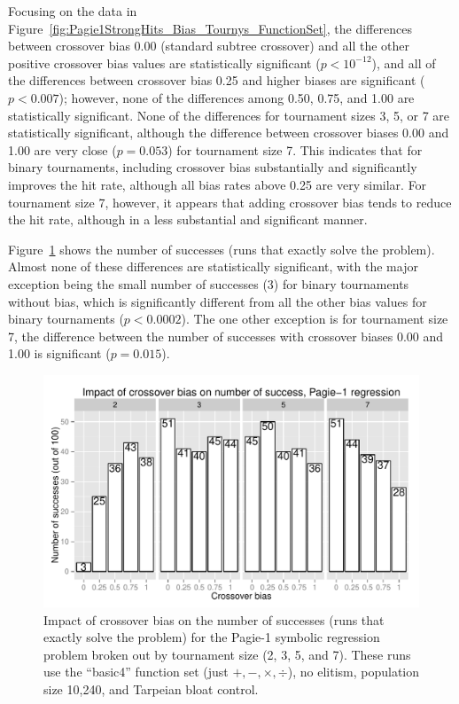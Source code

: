 \documentclass{sig-alternate}
\begin{document}
Focusing on the data in Figure~\ref{fig:Pagie1StrongHits_Bias_Tournys_FunctionSet}, the differences between crossover
bias 0.00 (standard subtree crossover) and all the other positive crossover bias values are statistically significant
($p<10^{-12}$), and all of the differences between crossover bias 0.25 and higher biases are significant ($p<0.007$);
however, none of the differences among 0.50, 0.75, and 1.00 are statistically significant. None of the differences for
tournament sizes 3, 5, or 7 are statistically significant, although the difference between crossover biases 0.00 and
1.00 are very close ($p=0.053$) for tournament size 7. This indicates that for binary tournaments, including crossover
bias substantially and significantly improves the hit rate, although all bias rates above 0.25 are very similar. For
tournament size 7, however, it appears that adding crossover bias tends to reduce the hit rate, although in a less
substantial and significant manner.

%
%
%
%

Figure~\ref{fig:Pagie1StrongSuccesses} shows the number of successes (runs that exactly solve the problem). Almost none
of these differences are statistically significant, with the major exception being the small number of successes (3)
for binary tournaments without bias, which is significantly different from all the other bias values for binary
tournaments ($p<0.0002$). The one other exception is for tournament size 7, the difference between the number of
successes with crossover biases 0.00 and 1.00 is significant ($p=0.015$).

\begin{figure}
\centering
\includegraphics[width=0.45 \textwidth]{Plots/Pagie_1_Strong_Successes_vs_Bias.pdf}
\caption{Impact of crossover bias on the number of successes (runs that exactly solve the problem) for the Pagie-1
symbolic regression problem broken out by tournament size (2, 3, 5, and 7). These runs use the ``basic4'' function set
(just $+, -, \times, \div$), no elitism, population size 10,240, and Tarpeian bloat control.}
\label{fig:Pagie1StrongSuccesses}
\end{figure}
\end{document}
